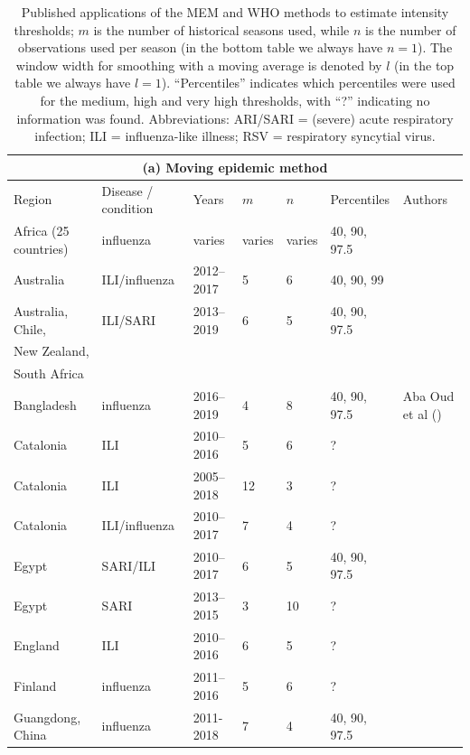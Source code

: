 \documentclass[12pt]{article}
\begin{document}
\begin{table}[h!]
\caption{\footnotesize Published applications of the MEM and WHO methods to estimate intensity thresholds; $m$ is the number of historical seasons used, while $n$ is the number of observations used per season (in the bottom table we always have $n = 1$). The window width for smoothing with a moving average is denoted by $l$ (in the top table we always have $l = 1$). ``Percentiles'' indicates which percentiles were used for the medium, high and very high thresholds, with ``?'' indicating no information was found. Abbreviations: ARI/SARI = (severe) acute respiratory infection; ILI = influenza-like illness; RSV = respiratory syncytial virus.}
\label{tab:literature}
\center
\scriptsize
\begin{tabular}{l l l l l l l}
\toprule
\multicolumn{7}{c}{(a) Moving epidemic method}\\
\toprule
Region & Disease / condition & Years & $m$ & $n$ & Percentiles & Authors\\
\midrule
Africa (25 countries) & influenza & varies & varies & varies & 40, 90, 97.5 & \cite{Igboh2021} \\
Australia & ILI/influenza & 2012--2017 & 5 & 6 & 40, 90, 99 & \cite{Vette2018}\\
Australia, Chile, & ILI/SARI & 2013--2019 & 6 & 5 & 40, 90, 97.5 & \cite{Sullivan2019}\\
New Zealand,\\
South Africa\\
Bangladesh & influenza & 2016--2019 & 4 & 8 & 40, 90, 97.5 & Aba Oud et al (\citeyear{AbaOud2021})\\
Catalonia & ILI & 2010--2016 & 5 & 6 & ? & \cite{Basile2018}\\
Catalonia & ILI & 2005--2018 & 12 & 3 & ? & \cite{Basile2019}\\
Catalonia & ILI/influenza & 2010--2017 & 7 & 4 & ? & \cite{Torner2019}\\
Egypt & SARI/ILI & 2010--2017 & 6 & 5 & 40, 90, 97.5 & \cite{AbdElGawad2020}\\
Egypt & SARI & 2013--2015 & 3 & 10 & ? & \cite{Elhakim2019}\\
England & ILI & 2010--2016 & 6 & 5 & ? & \cite{Wagner2018}\\
Finland & influenza & 2011--2016 & 5 & 6 & ? & \cite{Pesaelae2019}\\
Guangdong, China & influenza & 2011-2018 & 7 & 4 & 40, 90, 97.5 & \cite{Kang2021} \\

\end{tabular}
\end{table}
\end{document}
